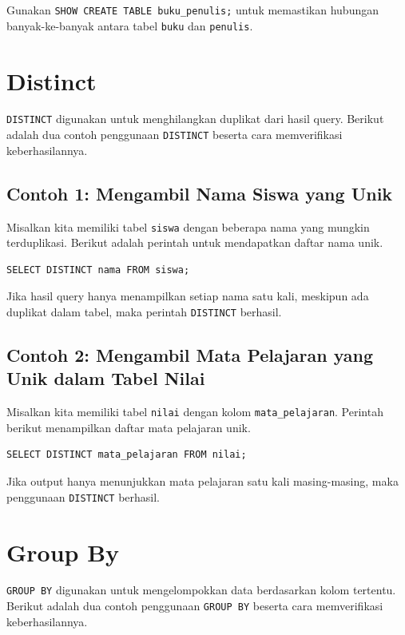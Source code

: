 Gunakan \texttt{SHOW CREATE TABLE buku\_penulis;} untuk memastikan hubungan banyak-ke-banyak antara tabel \texttt{buku} dan \texttt{penulis}.

\section{Distinct}

\texttt{DISTINCT} digunakan untuk menghilangkan duplikat dari hasil query. Berikut adalah dua contoh penggunaan \texttt{DISTINCT} beserta cara memverifikasi keberhasilannya.

\subsection*{Contoh 1: Mengambil Nama Siswa yang Unik}
Misalkan kita memiliki tabel \texttt{siswa} dengan beberapa nama yang mungkin terduplikasi. Berikut adalah perintah untuk mendapatkan daftar nama unik.

\begin{lstlisting}[style=sql]
	SELECT DISTINCT nama FROM siswa;
\end{lstlisting}

Jika hasil query hanya menampilkan setiap nama satu kali, meskipun ada duplikat dalam tabel, maka perintah \texttt{DISTINCT} berhasil.

\subsection*{Contoh 2: Mengambil Mata Pelajaran yang Unik dalam Tabel Nilai}
Misalkan kita memiliki tabel \texttt{nilai} dengan kolom \texttt{mata\_pelajaran}. Perintah berikut menampilkan daftar mata pelajaran unik.

\begin{lstlisting}[style=sql]
	SELECT DISTINCT mata_pelajaran FROM nilai;
\end{lstlisting}

Jika output hanya menunjukkan mata pelajaran satu kali masing-masing, maka penggunaan \texttt{DISTINCT} berhasil.

\section{Group By}

\texttt{GROUP BY} digunakan untuk mengelompokkan data berdasarkan kolom tertentu. Berikut adalah dua contoh penggunaan \texttt{GROUP BY} beserta cara memverifikasi keberhasilannya.

